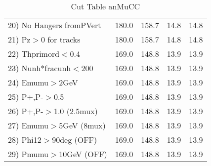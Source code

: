 \begin{table}[h!]
\begin{tabular}{||l||r|r|r|r||}
 20) No Hangers fromPVert &       180.0 &       158.7 &        14.8 &        14.8 \\
 21) Pz$>$0 for tracks    &       180.0 &       158.7 &        14.8 &        14.8 \\
 22) Thprimord$<$0.4      &       169.0 &       148.8 &        13.9 &        13.9 \\
 23) Nunh*fracunh$<$200   &       169.0 &       148.8 &        13.9 &        13.9 \\
 24) Emumu$>$2GeV         &       169.0 &       148.8 &        13.9 &        13.9 \\
 25) P+,P-$>$0.5          &       169.0 &       148.8 &        13.9 &        13.9 \\
 26) P+,P-$>$1.0 (2.5mux) &       169.0 &       148.8 &        13.9 &        13.9 \\
 27) Emumu$>$5GeV  (8mux) &       169.0 &       148.8 &        13.9 &        13.9 \\
 28) Phi12$>$90deg  (OFF) &       169.0 &       148.8 &        13.9 &        13.9 \\
 29) Pmumu$>$10GeV  (OFF) &       169.0 &       148.8 &        13.9 &        13.9 \\
 \hline
 \hline
 \end{tabular}
 \caption{Cut Table  anMuCC }
 \label{tab-cut_anmcc}
 \end{table}
